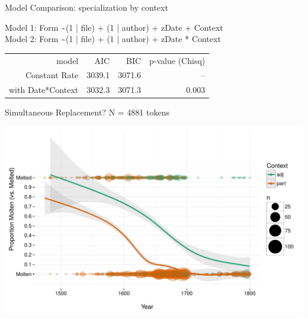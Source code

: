\documentclass[hyperref={pdfpagelabels=false}]{beamer}
\begin{document}
\begin{frame}{Model Comparison: specialization by context}

\begin{center}
Model 1: Form \textasciitilde  (1 | file) + (1 | author) + zDate + Context\\
\vspace*{1mm}
Model 2: Form \textasciitilde  (1 | file) + (1 | author) + zDate{  }*{  }Context\\
\vspace*{4mm}

	\begin{tabular}{rrrr}
\toprule
	model & AIC & BIC & p-value (Chisq)\\
	\cmidrule{2-4}
Constant Rate & 3039.1 & 3071.6 & -- \\
with Date*Context &  3032.3 & 3071.3 & 0.003\\
\bottomrule
\end{tabular}
\end{center}
\end{frame}


\begin{frame}{Simultaneous Replacement? N =  4881 tokens}

\begin{center}
\includegraphics[width=1.1\textwidth]{FormByDateUnbinnedWithDots2.pdf}
\end{center}
\end{frame}
\end{document}
